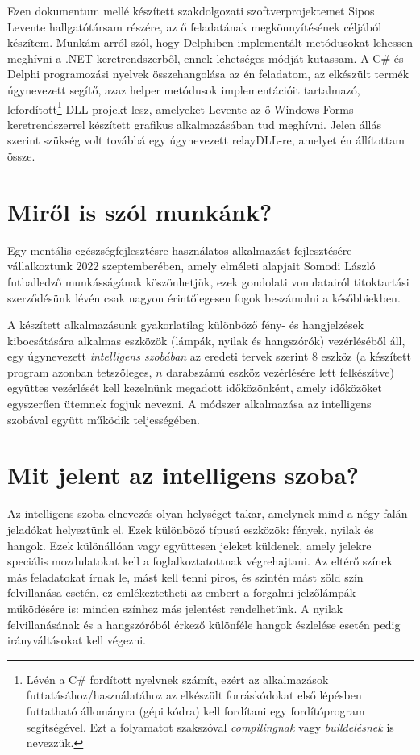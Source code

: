 \documentclass[tocnopagenum]{thesis-ekf}
\begin{document}
	Ezen dokumentum mellé készített szakdolgozati szoftverprojektemet Sipos Levente hallgatótársam részére, az ő feladatának megkönnyítésének céljából készítem. 
	Munkám arról szól, hogy Delphiben implementált metódusokat lehessen meghívni a .NET-keretrendszerből, ennek lehetséges módját kutassam. A C\# és Delphi programozási nyelvek összehangolása az én feladatom, az elkészült termék úgynevezett segítő, azaz helper metódusok implementációit tartalmazó, lefordított\footnote{Lévén a C\# fordított nyelvnek számít, ezért az alkalmazások futtatásához/használatához az elkészült forráskódokat első lépésben futtatható állományra (gépi kódra) kell fordítani egy fordítóprogram segítségével. Ezt a folyamatot szakszóval \textit{compilingnak} vagy \textit{buildelésnek} is nevezzük.} DLL-projekt lesz, amelyeket Levente az ő Windows Forms keretrendszerrel készített grafikus alkalmazásában tud meghívni. Jelen állás szerint szükség volt továbbá egy úgynevezett relayDLL-re, amelyet én állítottam össze.
	
	\section{Miről is szól munkánk?}
	Egy mentális egészségfejlesztésre használatos alkalmazást fejlesztésére vállalkoztunk 2022 szeptemberében, amely elméleti alapjait Somodi László futballedző munkásságának köszönhetjük, ezek gondolati vonulatairól titoktartási szerződésünk lévén csak nagyon érintőlegesen fogok beszámolni a későbbiekben. 
	
	A készített alkalmazásunk gyakorlatilag különböző fény- és hangjelzések kibocsátására alkalmas eszközök (lámpák, nyilak és hangszórók) vezérléséből áll, egy úgynevezett \emph{intelligens szobában} az eredeti tervek szerint 8 eszköz (a készített program azonban tetszőleges, $n$ darabszámú eszköz vezérlésére lett felkészítve) együttes vezérlését kell kezelnünk megadott időközönként, amely időközöket egyszerűen ütemnek fogjuk nevezni.
	A módszer alkalmazása az intelligens szobával együtt működik teljességében.
	
	\section{Mit jelent az intelligens szoba?}
	Az intelligens szoba elnevezés olyan helységet takar, amelynek mind a négy falán jeladókat helyeztünk el.
	Ezek különböző típusú eszközök: fények, nyilak és hangok. 
	Ezek különállóan vagy együttesen jeleket küldenek, amely jelekre speciális mozdulatokat kell a foglalkoztatottnak végrehajtani.
	Az eltérő színek más feladatokat írnak le, mást kell tenni piros, és szintén mást zöld szín felvillanása esetén, ez emlékeztetheti az embert a forgalmi jelzőlámpák működésére is: minden színhez más jelentést rendelhetünk. A nyilak felvillanásának és a hangszóróból érkező különféle hangok észlelése esetén pedig irányváltásokat kell végezni.
	
\end{document}
